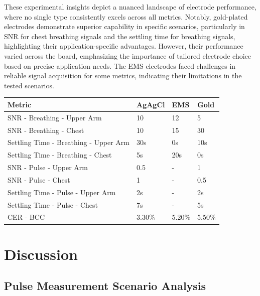 \documentclass[conference]{IEEEtran}
\begin{document}
These experimental insights depict a nuanced landscape of electrode performance, where no single type consistently excels across all metrics. Notably, gold-plated electrodes demonstrate superior capability in specific scenarios, particularly in SNR for chest breathing signals and the settling time for breathing signals, highlighting their application-specific advantages. However, their performance varied across the board, emphasizing the importance of tailored electrode choice based on precise application needs. The EMS electrodes faced challenges in reliable signal acquisition for some metrics, indicating their limitations in the tested scenarios.


\begin{table}[!ht]
    \centering
    \begin{tabular}{|l|l|l|l|}
    \hline
        Metric & AgAgCl & EMS & Gold \\ \hline
        SNR - Breathing - Upper Arm & 10 & 12 & 5 \\ \hline
        SNR - Breathing - Chest & 10 & 15 & 30 \\ \hline
        Settling Time - Breathing - Upper Arm & 30s & 0s & 10s \\ \hline
        Settling Time - Breathing - Chest & 5s & 20s & 0s \\ \hline
        SNR - Pulse - Upper Arm & 0.5 & - & 1 \\ \hline
        SNR - Pulse - Chest & 1 & - & 0.5 \\ \hline
        Settling Time - Pulse - Upper Arm & 2s & - & 2s \\ \hline
        Settling Time - Pulse - Chest & 7s & - & 5s \\ \hline
        CER - BCC & 3.30\% & 5.20\% & 5.50\% \\ \hline
    \end{tabular}
\end{table}

\section{Discussion}

\subsection{Pulse Measurement Scenario Analysis}
\end{document}
